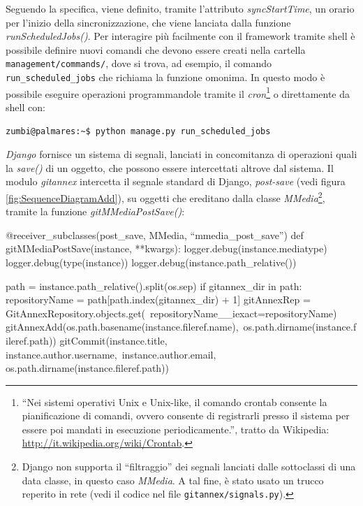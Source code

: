 Seguendo la specifica, viene definito, tramite l'attributo
\emph{syncStartTime}, un orario per l'inizio della sincronizzazione,
che viene lanciata dalla funzione \emph{runScheduledJobs()}. Per
interagire più facilmente con il framework tramite shell è possibile
definire nuovi comandi che devono essere creati nella cartella
\verb|management/commands/|, dove si trova, ad esempio, il comando
\verb|run_scheduled_jobs| che richiama la funzione omonima. In questo
modo è possibile eseguire operazioni programmandole tramite il
\emph{cron}\footnote{``Nei sistemi operativi Unix e Unix-like, il
  comando crontab consente la pianificazione di comandi, ovvero
  consente di registrarli presso il sistema per essere poi mandati in
  esecuzione periodicamente.'', tratto da Wikipedia:
  \url{http://it.wikipedia.org/wiki/Crontab}.} o direttamente da shell
con:
\begin{verbatim}
zumbi@palmares:~$ python manage.py run_scheduled_jobs
\end{verbatim}

\emph{Django} fornisce un sistema di segnali, lanciati in concomitanza di
operazioni quali la \emph{save()} di un oggetto, che possono essere
intercettati altrove dal sistema. Il modulo \emph{gitannex} intercetta
il segnale standard di Django, \emph{post-save} (vedi figura
\ref{fig:SequenceDiagramAdd}), su oggetti che ereditano dalla classe
\emph{MMedia}\footnote{Django non supporta il ``filtraggio'' dei
  segnali lanciati dalle sottoclassi di una data classe, in questo
  caso \emph{MMedia}. A tal fine, è stato usato un trucco reperito in
  rete (vedi il codice nel file \texttt{gitannex/signals.py}).},
tramite la funzione \emph{gitMMediaPostSave()}:

\begin{code}
@receiver_subclasses(post_save, MMedia, ``mmedia_post_save'')
def gitMMediaPostSave(instance, **kwargs):
    logger.debug(instance.mediatype)
    logger.debug(type(instance))
    logger.debug(instance.path_relative())

    path = instance.path_relative().split(os.sep)
    if gitannex_dir in path:
        repositoryName = path[path.index(gitannex_dir) + 1]
        gitAnnexRep = GitAnnexRepository.objects.get(\
                      repositoryName__iexact=repositoryName)
        gitAnnexAdd(os.path.basename(instance.fileref.name),\
                    os.path.dirname(instance.fileref.path))
        gitCommit(instance.title, instance.author.username,\
                  instance.author.email, os.path.dirname(instance.fileref.path))
\end{code}







